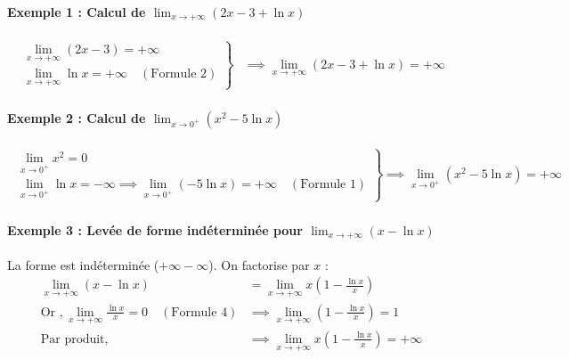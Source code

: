 \documentclass[12pt,a4paper]{article}
\begin{document}
\begin{tcolorbox}[colback=gray!5!white,colframe=myblue,title=\textbf{Exemples d'application}]

\paragraph{Exemple 1 : Calcul de $\lim_{x \to +\infty} (2x - 3 + \ln x)$}
\[
\begin{aligned}
\left.
\begin{array}{l}
\lim_{x \to +\infty} (2x - 3) = +\infty \\[2mm]
\lim_{x \to +\infty} \ln x = +\infty \quad (\text{Formule 2})
\end{array}
\right\} 
&\implies \lim_{x \to +\infty} (2x - 3 + \ln x) = +\infty
\end{aligned}
\]

\vspace{0.3cm}

\paragraph{Exemple 2 : Calcul de $\lim_{x \to 0^+} (x^2 - 5\ln x)$}
\[
\begin{aligned}
\left.
\begin{array}{l}
\lim_{x \to 0^+} x^2 = 0 \\[2mm]
\lim_{x \to 0^+} \ln x = -\infty \implies \lim_{x \to 0^+} (-5\ln x) = +\infty \quad (\text{Formule 1})
\end{array}
\right\} 
&\implies \lim_{x \to 0^+} (x^2 - 5\ln x) = +\infty
\end{aligned}
\]

\vspace{0.3cm}

\paragraph{Exemple 3 : Levée de forme indéterminée pour $\lim_{x \to +\infty} (x - \ln x)$}
La forme est indéterminée ($+\infty - \infty$). On factorise par $x$ :
\[
\begin{aligned}
\lim_{x \to +\infty} (x - \ln x) &= \lim_{x \to +\infty} x \left(1 - \frac{\ln x}{x}\right) \\[2mm]
\text{Or }, \lim_{x \to +\infty} \frac{\ln x}{x} = 0 \quad (\text{Formule 4}) &\implies \lim_{x \to +\infty} \left(1 - \frac{\ln x}{x}\right) = 1 \\[2mm]
\text{Par produit, } &\implies \lim_{x \to +\infty} x \left(1 - \frac{\ln x}{x}\right) = +\infty
\end{aligned}
\]


\end{tcolorbox}
\end{document}
